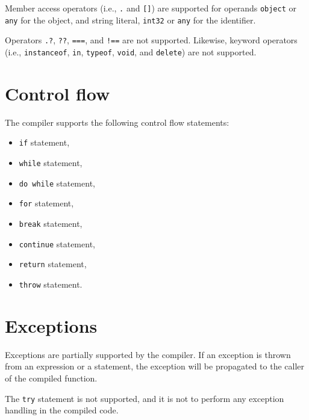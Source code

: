 Member access operators (i.e., \texttt{.} and \texttt{[]}) are supported for operands \texttt{object} or \texttt{any} for the object, and string literal, \texttt{int32} or \texttt{any} for the identifier.

Operators \texttt{.?}, \texttt{??}, \texttt{===}, and \texttt{!==} are not supported. Likewise, keyword operators (i.e., \texttt{instanceof}, \texttt{in}, \texttt{typeof}, \texttt{void}, and \texttt{delete}) are not supported.


\section{Control flow}

The compiler supports the following control flow statements:
\begin{itemize}
    \item \texttt{if} statement,
    \item \texttt{while} statement,
    \item \texttt{do while} statement,
    \item \texttt{for} statement,
    \item \texttt{break} statement,
    \item \texttt{continue} statement,
    \item \texttt{return} statement,
    \item \texttt{throw} statement.
\end{itemize}


\section{Exceptions}

Exceptions are partially supported by the compiler. If an exception is thrown from an expression or a statement, the exception will be propagated to the caller of the compiled function.

The \texttt{try} statement is not supported, and it is not to perform any exception handling in the compiled code.






